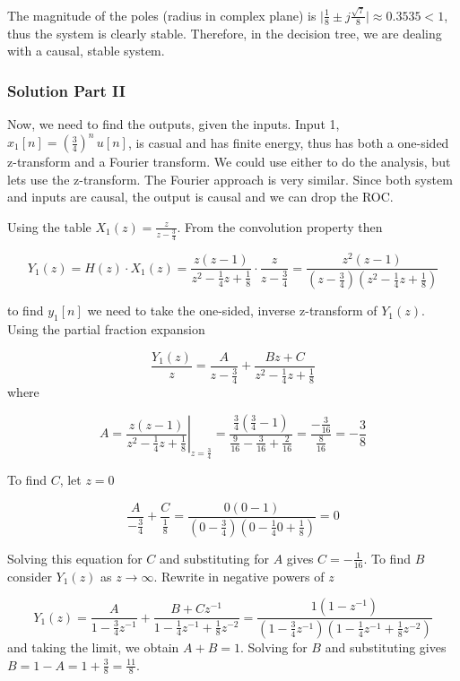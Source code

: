 \documentclass{article}
\begin{document}
The magnitude of the poles (radius in complex plane) is $\lvert \frac{1}{8} \pm j \frac{\sqrt{7}}{8} \rvert \approx 0.3535 < 1$, thus the system is clearly stable. Therefore, in the decision tree, we are dealing with a causal, stable system.

\subsubsection{Solution Part II}

Now, we need to find the outputs, given the inputs. Input 1, $x_1[n] = \left(\frac{3}{4}\right)^n\, u[n]$, is casual and has finite energy, thus has both a one-sided z-transform and a Fourier transform. We could use either to do the analysis, but lets use the z-transform. The Fourier approach is very similar. Since both system and inputs are causal, the output is causal and we can drop the ROC.

Using the table $X_1(z) = \frac{z}{z-\frac{3}{4}}$. From the convolution property then

\[
Y_1(z) = H(z)\cdot X_1(z) = \frac{z(z-1)}{z^2 - \frac{1}{4}z + \frac{1}{8}} \cdot \frac{z}{z-\frac{3}{4}} = \frac{z^2(z-1)}{\left(z-\frac{3}{4} \right) \left( z^2 - \frac{1}{4}z + \frac{1}{8} \right)}
\]

to find $y_1[n]$ we need to take the one-sided, inverse z-transform of $Y_1(z)$. Using the partial fraction expansion

\[
\frac{Y_1(z)}{z} = \frac{A}{z-\frac{3}{4}} + \frac{Bz + C}{z^2 - \frac{1}{4}z + \frac{1}{8}}
\]
where

\[
A = \left. \frac{z(z-1)}{z^2 - \frac{1}{4}z + \frac{1}{8}} \right\rvert_{z = \frac{3}{4}} = \frac{\frac{3}{4}(\frac{3}{4}-1)}{\frac{9}{16} - \frac{3}{16} + \frac{2}{16}} = \frac{-\frac{3}{16}}{\frac{8}{16}} = -\frac{3}{8} 
\]

To find $C$, let $z= 0$

\[
\frac{A}{-\frac{3}{4}} + \frac{C}{\frac{1}{8}} = \frac{0(0-1)}{\left(0-\frac{3}{4} \right) \left( 0 - \frac{1}{4}0 + \frac{1}{8} \right)} = 0
\]

Solving this equation for $C$ and substituting for $A$ gives $C = -\frac{1}{16}$. To find $B$ consider $Y_1(z)$ as $z \rightarrow \infty$. Rewrite in negative powers of $z$

\[
Y_1(z) = \frac{A}{1-\frac{3}{4}z^{-1}} + \frac{B + Cz^{-1}}{1 - \frac{1}{4}z^{-1} + \frac{1}{8}z^{-2}} = \frac{1(1-z^{-1})}{\left(1-\frac{3}{4}z^{-1} \right) \left( 1 - \frac{1}{4}z^{-1} + \frac{1}{8}z^{-2} \right)}
\]
and taking the limit, we obtain $A + B = 1$. Solving for $B$ and substituting gives $B = 1-A = 1+\frac{3}{8} = \frac{11}{8}$.
\end{document}
